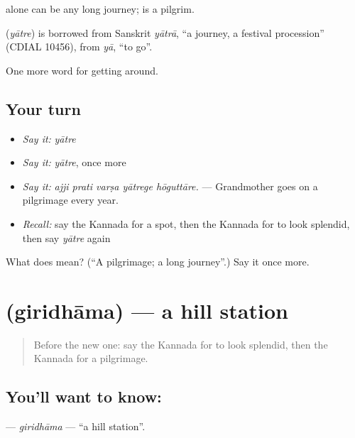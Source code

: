  alone can be any long journey;  is a pilgrim.

\begin{cousinweb}
\textbf{} (\emph{yātre}) is borrowed from Sanskrit \emph{yātrā}, \textquotedblleft{}a journey, a festival procession\textquotedblright{} (CDIAL 10456), from \emph{yā}, \textquotedblleft{}to go\textquotedblright{}.
\end{cousinweb}

\begin{grammarlens}[title={What you've built}]
One more word for getting around.
\end{grammarlens}

\subsection*{Your turn}
\begin{itemize}
\raggedright
  \item \emph{Say it:} \emph{yātre}
  \item \emph{Say it:} \emph{yātre}, once more
  \item \emph{Say it:} \emph{ajji prati varṣa yātrege hōguttāre.} — Grandmother goes on a pilgrimage every year.
  \item \emph{Recall:} say the Kannada for a spot, then the Kannada for to look splendid, then say \emph{yātre} again
\end{itemize}

\begin{tcolorbox}[breakable,colback=teal!4,colframe=teal!35!black,title={Before you move on}]
What does  mean? (\textquotedblleft{}A pilgrimage; a long journey\textquotedblright{}.) Say it once more.
\end{tcolorbox}
\section[\texorpdfstring{\kn{ಗಿರಿಧಾಮ} (giridhāma)}{ಗಿರಿಧಾಮ (giridhāma)}]{ (giridhāma) — a hill station}

\label{lesson:KA-C458-giridhama}



\begin{quote}
Before the new one: say the Kannada for to look splendid, then the Kannada for a pilgrimage.
\end{quote}

\subsection*{You'll want to know: }
\textbf{} — \emph{giridhāma} — \textquotedblleft{}a hill station\textquotedblright{}.


